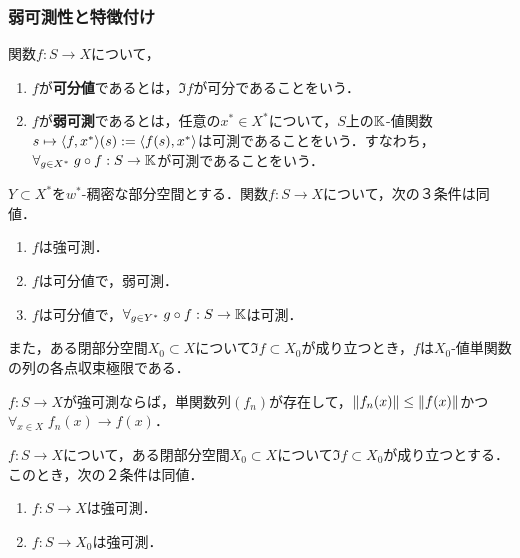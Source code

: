 \documentclass[uplatex,dvipdfmx]{jsreport}
\begin{document}
\subsubsection{弱可測性と特徴付け}

\begin{definition}
    関数$f:S\to X$について，
    \begin{enumerate}
        \item $f$が\textbf{可分値}であるとは，$\Im f$が可分であることをいう．
        \item $f$が\textbf{弱可測}であるとは，任意の$x^*\in X^*$について，$S$上の$\mathbb{K}$-値関数$s\mapsto\langle f,x^*\rangle(s):=\langle f(s),x^*\rangle$は可測であることをいう．すなわち，$\forall_{g\in X^*}\;g\circ f:S\to\mathbb{K}$が可測であることをいう．
    \end{enumerate}
\end{definition}

\begin{theorem}
    $Y\subset X^*$を$w^*$-稠密な部分空間とする．関数$f:S\to X$について，次の３条件は同値．
    \begin{enumerate}
        \item $f$は強可測．
        \item $f$は可分値で，弱可測．
        \item $f$は可分値で，$\forall_{g\in Y^*}\;g\circ f:S\to\mathbb{K}$は可測．
    \end{enumerate}
    また，ある閉部分空間$X_0\subset X$について$\Im f\subset X_0$が成り立つとき，$f$は$X_0$-値単関数の列の各点収束極限である．
\end{theorem}

\begin{corollary}[単関数列は単調増加に取れる]
    $f:S\to X$が強可測ならば，単関数列$(f_n)$が存在して，$\|f_n(x)\|\le\|f(x)\|$かつ$\forall_{x\in X}\;f_n(x)\to f(x)$．
\end{corollary}

\begin{corollary}
    $f:S\to X$について，ある閉部分空間$X_0\subset X$について$\Im f\subset X_0$が成り立つとする．
    このとき，次の２条件は同値．
    \begin{enumerate}
        \item $f:S\to X$は強可測．
        \item $f:S\to X_0$は強可測．
    \end{enumerate}
\end{corollary}
\end{document}
